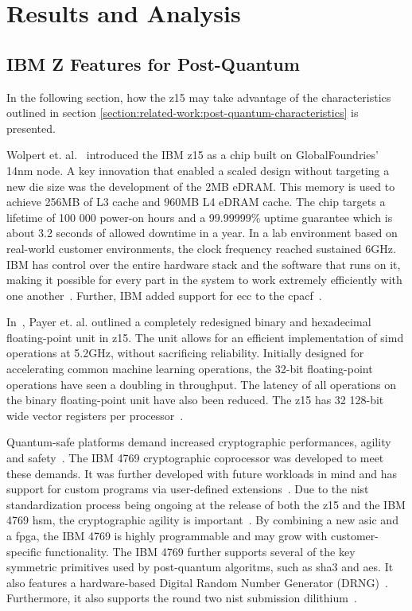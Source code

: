 \chapter{Results and Analysis}
\label{chapter:results}

\section{IBM Z Features for Post-Quantum}
\label{section:results:z15}

In the following section, how the \gls{z15} may take advantage of the characteristics outlined in section \ref{section:related-work:post-quantum-characteristics} is presented.

Wolpert et. al.~\cite{wolpert2020} introduced the IBM \gls{z15} as a chip built on GlobalFoundries' 14nm node. A key innovation that enabled a scaled design without targeting a new die size was the development of the 2MB eDRAM. This memory is used to achieve 256MB of L3 cache and 960MB L4 eDRAM cache. The chip targets a lifetime of 100 000 power-on hours and a 99.99999\% uptime guarantee which is about 3.2 seconds of allowed downtime in a year. In a lab environment based on real-world customer environments, the clock frequency reached sustained 6GHz. IBM has control over the entire hardware stack and the software that runs on it, making it possible for every part in the system to work extremely efficiently with one another~\cite{wolpert2020}. Further, IBM added support for \gls{ecc} to the \gls{cpacf}~\cite{berry2020}.

In~\cite{payer2020}, Payer et. al. outlined a completely redesigned binary and hexadecimal floating-point unit in \gls{z15}. The unit allows for an efficient implementation of \gls{simd} operations at 5.2GHz, without sacrificing reliability. Initially designed for accelerating common machine learning operations, the 32-bit floating-point operations have seen a doubling in throughput. The latency of all operations on the binary floating-point unit have also been reduced. The \gls{z15} has 32 128-bit wide vector registers per processor~\cite{redbook:z15}.

Quantum-safe platforms demand increased cryptographic performances, agility and safety~\cite{busby2020}. The IBM 4769 cryptographic coprocessor was developed to meet these demands. It was further developed with future workloads in mind and has support for custom programs via user-defined extensions~\cite{busby2020, ibm:4769}. Due to the \gls{nist} standardization process being ongoing at the release of both the \gls{z15} and the IBM 4769 \gls{hsm}, the cryptographic agility is important~\cite{microsoft2020, ibm:z15:2019}. By combining a new \gls{asic} and a \gls{fpga}, the IBM 4769 is highly programmable and may grow with customer-specific functionality. The IBM 4769 further supports several of the key symmetric primitives used by \gls{post-quantum} algoritms, such as \gls{sha3} and \gls{aes}. It also features a hardware-based Digital Random Number Generator (DRNG)~\cite{ibm:4769:ep11}. Furthermore, it also supports the round two \gls{nist} submission \gls{dilithium}~\cite{ibm:4769:ep11, busby2020}.

